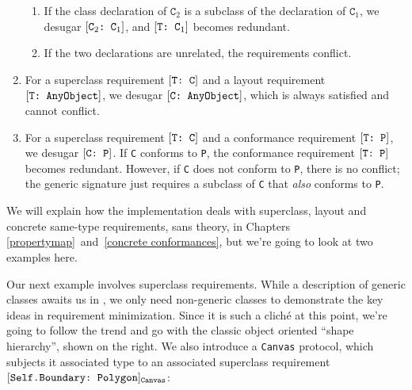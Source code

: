 \documentclass[../generics]{subfiles}
\begin{document}
\begin{definition}
\begin{enumerate}
\begin{enumerate}
\item If the class declaration of $\texttt{C}_2$ is a subclass of the declaration of $\texttt{C}_1$, we desugar $[\texttt{$\texttt{C}_2$:~$\texttt{C}_1$}]$, and $[\texttt{T:~$\texttt{C}_1$}]$ becomes redundant.
\item If the two declarations are unrelated, the requirements conflict.
\end{enumerate}
\item For a superclass requirement $[\texttt{T:~C}]$ and a layout requirement $[\texttt{T:~AnyObject}]$, we desugar $[\texttt{C:~AnyObject}]$, which is always satisfied and cannot conflict.
\item For a superclass requirement $[\texttt{T:~C}]$ and a conformance requirement $[\texttt{T:~P}]$, we desugar $[\texttt{C:~P}]$. If \texttt{C} conforms to \texttt{P}, the conformance requirement $[\texttt{T:~P}]$ becomes redundant. However, if \texttt{C} does not conform to \texttt{P}, there is no conflict; the generic signature just requires a subclass of \texttt{C} that \emph{also} conforms to \texttt{P}.
\end{enumerate}
\end{definition}

We will explain how the implementation deals with superclass, layout and concrete same-type requirements, sans theory, in Chapters \ref{propertymap}~and~\ref{concrete conformances}, but we're going to look at two examples here.

\smallskip

\begin{wrapfigure}[8]{r}{4.2cm}
\begin{center}
\end{center}
\end{wrapfigure}

Our next example involves superclass requirements. While a description of generic classes awaits us in , we only need non-generic classes to demonstrate the key ideas in requirement minimization. Since it is such a clich\'e at this point, we're going to follow the trend and go with the classic object oriented ``shape hierarchy'', shown on the right. We also introduce a \texttt{Canvas} protocol, which subjects it associated type to an associated superclass requirement $[\texttt{Self.Boundary:~Polygon}]_\texttt{Canvas}$:
\end{document}
